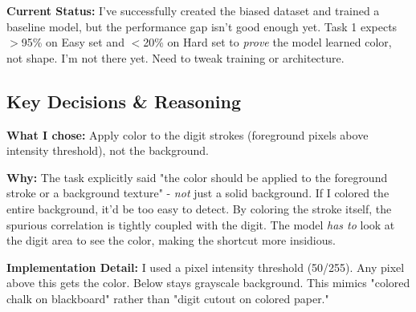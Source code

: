 \documentclass[9pt,a4paper,twocolumn,twoside]{tau-class/tau}
\begin{document}
        \begin{note}
            \textbf{Current Status:} I've successfully created the biased dataset and trained a baseline model, but the performance gap isn't good enough yet. Task 1 expects $>$95\% on Easy set and $<$20\% on Hard set to \textit{prove} the model learned color, not shape. I'm not there yet. Need to tweak training or architecture.
        \end{note}
        
    \subsection{Key Decisions \& Reasoning}
    
        \begin{tauenv}[frametitle=Decision: Stroke-Based Coloring (Not Background)]
            \textbf{What I chose:} Apply color to the digit strokes (foreground pixels above intensity threshold), not the background.
            
            \textbf{Why:} The task explicitly said "the color should be applied to the foreground stroke or a background texture" - \textit{not} just a solid background. If I colored the entire background, it'd be too easy to detect. By coloring the stroke itself, the spurious correlation is tightly coupled with the digit. The model \textit{has to} look at the digit area to see the color, making the shortcut more insidious.
            
            \textbf{Implementation Detail:} I used a pixel intensity threshold (50/255). Any pixel above this gets the color. Below stays grayscale background. This mimics "colored chalk on blackboard" rather than "digit cutout on colored paper."
        \end{tauenv}
        
\end{document}
